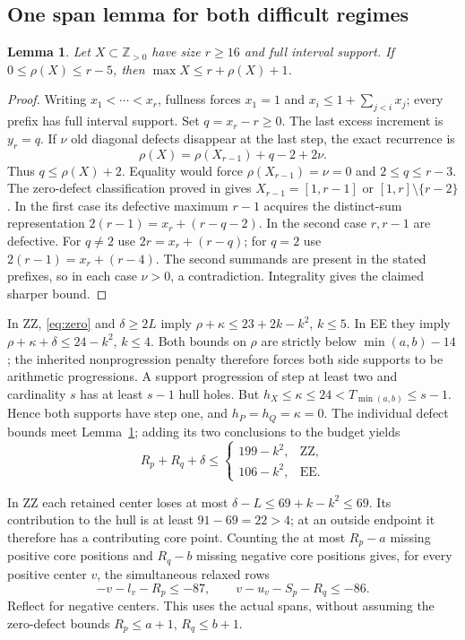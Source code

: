 \documentclass[11pt,a4paper]{article}
\newcommand{\Z}{\mathbb Z}
\newtheorem{lemma}[theorem]{Lemma}
\begin{document}
\subsection{One span lemma for both difficult regimes}
\begin{lemma}\label{lem:span}
Let $X\subset\Z_{>0}$ have size $r\ge16$ and full interval support.
If $0\le\rho(X)\le r-5$, then $\max X\le r+\rho(X)+1$.
\end{lemma}
\begin{proof}
Writing $x_1<\cdots<x_r$, fullness forces $x_1=1$ and
$x_i\le1+\sum_{j<i}x_j$; every prefix has full interval support.
Set $q=x_r-r\ge0$. The last excess increment is $y_r=q$.
If $\nu$ old diagonal defects disappear at the last step, the exact
recurrence is
\[
 \rho(X)=\rho(X_{r-1})+q-2+2\nu.
\]
Thus $q\le\rho(X)+2$. Equality would force
$\rho(X_{r-1})=\nu=0$ and $2\le q\le r-3$.
The zero-defect classification proved in \cite{base99} gives
$X_{r-1}=[1,r-1]$ or $[1,r]\setminus\{r-2\}$.
In the first case its defective maximum $r-1$ acquires the distinct-sum
representation $2(r-1)=x_r+(r-q-2)$.
In the second case $r,r-1$ are defective. For $q\ne2$ use
$2r=x_r+(r-q)$; for $q=2$ use $2(r-1)=x_r+(r-4)$.
The second summands are present in the stated prefixes, so in each case
$\nu>0$, a contradiction. Integrality gives the claimed sharper bound.
\end{proof}

In ZZ, \eqref{eq:zero} and $\delta\ge2L$ imply
$\rho+\kappa\le23+2k-k^2$, $k\le5$.
In EE they imply $\rho+\kappa+\delta\le24-k^2$, $k\le4$.
Both bounds on $\rho$ are strictly below $\min(a,b)-14$; the inherited
nonprogression penalty therefore forces both side supports to be
arithmetic progressions. A support progression of step at least two and
cardinality $s$ has at least $s-1$ hull holes. But
$h_X\le\kappa\le24<T_{\min(a,b)}\le s-1$.
Hence both supports have step one, and $h_P=h_Q=\kappa=0$.
The individual defect bounds meet Lemma~\ref{lem:span}; adding its two
conclusions to the budget yields
\begin{equation}\label{eq:span}
 R_p+R_q+\delta\le
 \begin{cases}199-k^2,&\text{ZZ},\\106-k^2,&\text{EE}.\end{cases}
\end{equation}

In ZZ each retained center loses at most
$\delta-L\le69+k-k^2\le69$. Its contribution to the hull is at least
$91-69=22>4$; at an outside endpoint it therefore has a contributing
core point. Counting the at most $R_p-a$ missing positive core positions
and $R_q-b$ missing negative core positions gives, for every positive
center $v$, the simultaneous relaxed rows
\begin{equation}\label{eq:ZZ}
 -v-l_v-R_p\le-87,\qquad v-u_v-S_p-R_q\le-86.
\end{equation}
Reflect for negative centers. This uses the actual spans, without
assuming the zero-defect bounds $R_p\le a+1$, $R_q\le b+1$.
\end{document}
